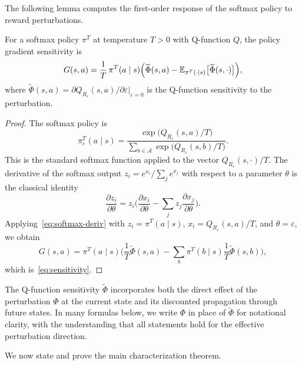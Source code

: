 The following lemma computes the first-order response of the softmax policy
to reward perturbations.

\begin{lemma}\label{lem:sensitivity}
For a softmax policy $\pi^T$ at temperature $T > 0$ with Q-function $Q$, the
policy gradient sensitivity is
\begin{equation}\label{eq:sensitivity}
G(s,a) = \frac{1}{T}\, \pi^T(a \mid s) \Bigl(\widetilde{\Phi}(s,a) -
  \mathbb{E}_{\pi^T(\cdot \mid s)}\bigl[\widetilde{\Phi}(s,\cdot)\bigr]
  \Bigr),
\end{equation}
where $\widetilde{\Phi}(s,a) = \partial Q_{R_\varepsilon}(s,a)/\partial
\varepsilon \big|_{\varepsilon=0}$ is the Q-function sensitivity to the
perturbation.
\end{lemma}

\begin{proof}
The softmax policy is
\[
\pi_\varepsilon^T(a \mid s) = \frac{\exp\bigl(Q_{R_\varepsilon}(s,a)/T
  \bigr)}{\sum_{b \in \mathcal{A}} \exp\bigl(Q_{R_\varepsilon}(s,b)/T\bigr)}.
\]
This is the standard softmax function applied to the vector
$Q_{R_\varepsilon}(s,\cdot)/T$. The derivative of the softmax output $z_i =
e^{x_i}/\sum_j e^{x_j}$ with respect to a parameter $\theta$ is the
classical identity
\begin{equation}\label{eq:softmax-deriv}
\frac{\partial z_i}{\partial \theta} = z_i \biggl(\frac{\partial x_i}
  {\partial \theta} - \sum_j z_j \frac{\partial x_j}{\partial \theta}\biggr).
\end{equation}
Applying~\eqref{eq:softmax-deriv} with $z_i = \pi^T(a \mid s)$,
$x_i = Q_{R_\varepsilon}(s,a)/T$, and $\theta = \varepsilon$, we obtain
\[
G(s,a) = \pi^T(a \mid s) \biggl(\frac{1}{T}\widetilde{\Phi}(s,a) -
  \sum_{b} \pi^T(b \mid s) \frac{1}{T}\widetilde{\Phi}(s,b)\biggr),
\]
which is~\eqref{eq:sensitivity}.
\end{proof}

\begin{remark}\label{rem:phi-tilde}
The Q-function sensitivity $\widetilde{\Phi}$ incorporates both the direct
effect of the perturbation $\Phi$ at the current state and its discounted
propagation through future states. In many formulas below, we write $\Phi$ in
place of $\widetilde{\Phi}$ for notational clarity, with the understanding
that all statements hold for the effective perturbation direction.
\end{remark}

We now state and prove the main characterization theorem.

